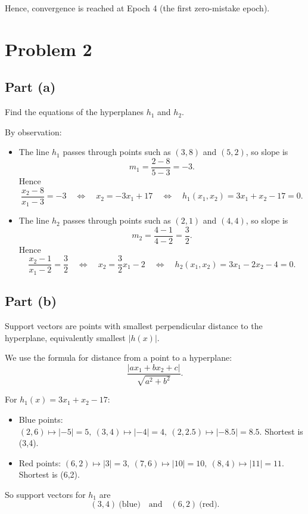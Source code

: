 \documentclass[fleqn]{article}
\begin{document}
    Hence, convergence is reached at Epoch 4 (the first zero-mistake epoch).

    \newpage
    \section{Problem 2}

    \subsection{Part (a)}
    Find the equations of the hyperplanes $h_1$ and $h_2$.

    \medskip
    \noindent By observation:
    \begin{itemize}
        \item The line $h_1$ passes through points such as $(3,8)$ and $(5,2)$, so slope is
        \[
            m_1=\frac{2-8}{5-3}=-3.
        \]
        Hence
        \[
            \frac{x_2-8}{x_1-3}=-3
            \quad\Longleftrightarrow\quad
            x_2=-3x_1+17
            \quad\Longleftrightarrow\quad
            h_1(x_1,x_2)=3x_1+x_2-17=0.
        \]
        \item The line $h_2$ passes through points such as $(2,1)$ and $(4,4)$, so slope is
        \[
            m_2=\frac{4-1}{4-2}=\frac{3}{2}.
        \]
        Hence
        \[
            \frac{x_2-1}{x_1-2}=\frac{3}{2}
            \quad\Longleftrightarrow\quad
            x_2=\frac{3}{2}x_1-2
            \quad\Longleftrightarrow\quad
            h_2(x_1,x_2)=3x_1-2x_2-4=0.
        \]
    \end{itemize}

    \subsection{Part (b)}
    \noindent Support vectors are points with smallest perpendicular distance to the hyperplane,
    equivalently smallest $|h(x)|$.

    \medskip
    \noindent We use the formula for distance from a point to a hyperplane:
    \[
        \frac{|ax_1+bx_2+c|}{\sqrt{a^2+b^2}}.
    \]

    \medskip
    \noindent For $h_1(x)=3x_1+x_2-17$:
    \begin{itemize}
        \item Blue points: $(2,6)\mapsto |{-5}|=5,\ (3,4)\mapsto |{-4}|=4,\ (2,2.5)\mapsto |{-8.5}|=8.5$. Shortest is (3,4).
        \item Red points: $(6,2)\mapsto |3|=3,\ (7,6)\mapsto |10|=10,\ (8,4)\mapsto |11|=11$. Shortest is (6,2).
    \end{itemize}
    So support vectors for $h_1$ are
    \[
        (3,4)\ \text{(blue)}\quad\text{and}\quad (6,2)\ \text{(red)}.
    \]
\end{document}
